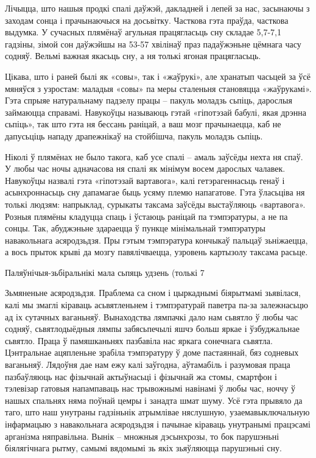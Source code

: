 Лічыцца, што нашыя продкі спалі даўжэй, дакладней і лепей за нас, засынаючы з заходам сонца і прачынаючыся на досьвітку. Часткова гэта праўда, часткова выдумка. У сучасных плямёнаў агульная працягласьць сну складае 5,7-7,1 гадзіны, зімой сон даўжэйшы на 53-57 хвілінаў праз падаўжэньне цёмнага часу содняў. Вельмі важная якасьць сну, а ня толькі ягоная працягласьць.

Цікава, што і раней былі як «совы», так і «жаўрукі», але хранатып часьцей за ўсё мяняўся з узростам: маладыя «совы» па меры сталеньня становяцца «жаўрукамі». Гэта спрыяе натуральнаму падзелу працы – пакуль моладзь сьпіць, дарослыя займаюцца справамі. Навукоўцы называюць гэтай «гіпотэзай бабулі, якая дрэнна сьпіць», так што гэта ня бессань раніцай, а ваш мозг прачынаецца, каб не дапусьціць нападу драпежнікаў на стойбішча, пакуль моладзь сьпіць.

Ніколі ў плямёнах не было такога, каб усе спалі – амаль заўсёды нехта ня спаў. У любы час ночы адначасова ня спалі як мінімум восем дарослых чалавек. Навукоўцы назвалі гэта «гіпотэзай вартавога», калі гетэрагеннасьць генаў і асынхроннасьць сну дапамагае быць усяму племю напагатове. Гэта ўласьціва ня толькі людзям: напрыклад, сурыкаты таксама заўсёды выстаўляюць «вартавога». Розныя плямёны кладуцца спаць і ўстаюць раніцай па тэмпэратуры, а не па сонцы. Так, абуджэньне здараецца ў пункце мінімальнай тэмпэратуры навакольнага асяродзьдзя. Пры гэтым тэмпэратура кончыкаў пальцаў зьніжаецца, а вось прыток крыві да мозгу павялічваецца, узровень картызолу таксама расьце.

Паляўнічыя-зьбіральнікі мала сьпяць удзень (толькі 7%

Зьмяненьне асяродзьдзя. Праблема са сном і цыркаднымі біярытмамі зьявілася, калі мы змаглі кіраваць асьвятленьнем і тэмпэратурай паветра па-за залежнасьцю ад іх сутачных ваганьняў. Вынаходства лямпачкі дало нам сьвятло ў любы час содняў, сьвятлодыёдныя лямпы забясьпечылі яшчэ больш яркае і ўзбуджальнае сьвятло. Праца ў памяшканьнях пазбавіла нас яркага сонечнага сьвятла. Цэнтральнае ацяпленьне зрабіла тэмпэратуру ў доме пастаяннай, бяз содневых ваганьняў. Лядоўня дае нам ежу калі заўгодна, аўтамабіль і разумовая праца пазбаўляюць нас фізычнай актыўнасьці і фізычнай жа стомы, смартфон і тэлевізар гатовыя напампаваць нас трывожнымі навінамі ў любы час, ноччу ў нашых спальнях няма поўнай цемры і занадта шмат шуму. Усё гэта прывяло да таго, што наш унутраны гадзіньнік атрымлівае няслушную, узаемавыключальную інфармацыю з навакольнага асяродзьдзя і пачынае кіраваць унутранымі працэсамі арганізма няправільна. Вынік – множныя дэсынхрозы, то бок парушэньні біялягічнага рытму, самымі вядомымі зь якіх зьяўляюцца парушэньні сну.

